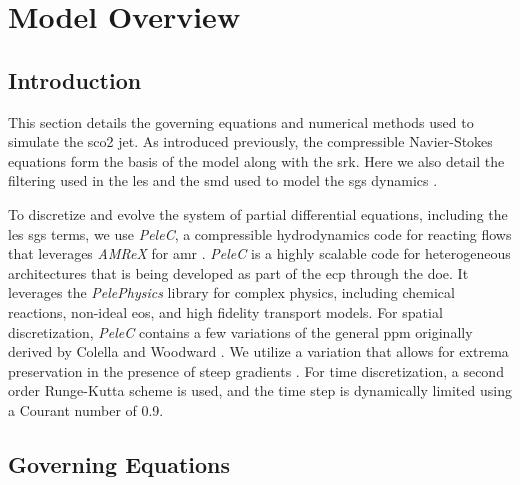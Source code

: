 \chapter{Model Overview}
\section{Introduction}
This section details the governing equations and numerical methods used to simulate the \gls{sco2} jet. As introduced previously, the compressible Navier-Stokes equations form the basis of the model along with the \gls{srk}. Here we also detail the filtering used in the \gls{les} and the \gls{smd} used to model the \gls{sgs} dynamics \cite{LES_Comp}. 

To discretize and evolve the system of partial differential equations, including the \gls{les} \gls{sgs} terms, we use \textit{PeleC}, a compressible hydrodynamics code for reacting flows that leverages \textit{AMReX} for \gls{amr} \cite{PeleC1, PeleC2}. \textit{PeleC} is a highly scalable code for heterogeneous architectures that is being developed as part of the \gls{ecp} through the \gls{doe}. It leverages the \textit{PelePhysics} library for complex physics, including chemical reactions, non-ideal \gls{eos}, and high fidelity transport models. For spatial discretization, \textit{PeleC} contains a few variations of the general \gls{ppm} originally derived by Colella and Woodward \cite{1984JCoPPPM}. We utilize a variation that allows for extrema preservation in the presence of steep gradients \cite{MILLER200226, COLELLA20087069}. For time discretization, a second order Runge-Kutta scheme is used, and the time step is dynamically limited using a Courant number of 0.9. 
\section{Governing Equations}


